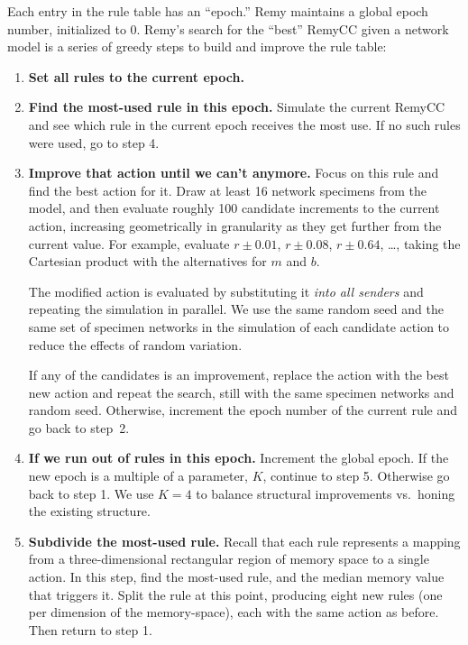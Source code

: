 Each entry in the rule table has an ``epoch.''
Remy maintains a global epoch number, initialized to 0. Remy's search
for the ``best'' RemyCC given a network model is a series of greedy
steps to build and improve the rule table:

\begin{enumerate}

\item\textbf{Set all rules to the current epoch.} 

\item \textbf{Find the most-used rule in this epoch.} Simulate the
  current RemyCC and see which rule in the current epoch
  receives the most use.  If no such rules were used, go
  to step 4.

\item \textbf{Improve that action until we can't anymore.} Focus on
  this rule and find the best action for it. Draw at least 16 network
  specimens from the model, and then evaluate roughly 100 candidate
  increments to the current action, increasing geometrically in
  granularity as they get further from the current value. For example,
  evaluate $r \pm 0.01$, $r \pm 0.08$, $r \pm 0.64$, \ldots, taking
  the Cartesian product with the alternatives for $m$ and $b$.

  The modified action is evaluated by substituting it \emph{into all
    senders} and repeating the simulation in parallel. We use the same
  random seed and the same set of specimen networks in the simulation of
  each candidate action to reduce the effects of random variation.

  If any of the candidates is an improvement, replace the action with
  the best new action and repeat the search, still with the same
  specimen networks and random seed. Otherwise, increment the epoch
  number of the current rule and go back to step~2.

\item \textbf{If we run out of rules in this epoch.} Increment the
  global epoch. If the new epoch is a multiple of a parameter, $K$,
  continue to step 5. Otherwise go back to step 1. We use $K = 4$ to
  balance structural improvements vs.~honing the existing structure.

\item \textbf{Subdivide the most-used rule.} Recall that each rule
  represents a mapping from a three-dimensional rectangular region of
  memory space to a single action. In this step, find the most-used
  rule, and the median memory value that triggers it. Split the rule
  at this point, producing eight new rules (one per dimension of the
  memory-space), each with the same action as before. Then return to
  step 1.

\end{enumerate}

